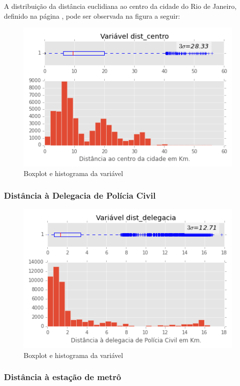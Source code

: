 A distribuição da distância euclidiana ao centro da cidade do Rio de Janeiro, definido na página \pageref{sec:obter_centro_rio}, pode ser observada na figura a seguir:

\begin{figure}[H]
 	\centering
 	\includegraphics[width=0.8\linewidth]{img/var_dist_centro_boxhist}
 	\caption{Boxplot e histograma da variável }
 	\label{fig:var_dist_centro_boxhist}
\end{figure} 

\subsubsection{Distância à Delegacia de Polícia Civil}

\begin{figure}[H]
	\centering
	\includegraphics[width=0.8\linewidth]{img/var_dist_delegacia_boxhist}
	\caption{Boxplot e histograma da variável }
	\label{fig:var_dist_delegacia_boxhist}
\end{figure} 

\subsubsection{Distância à estação de metrô}

